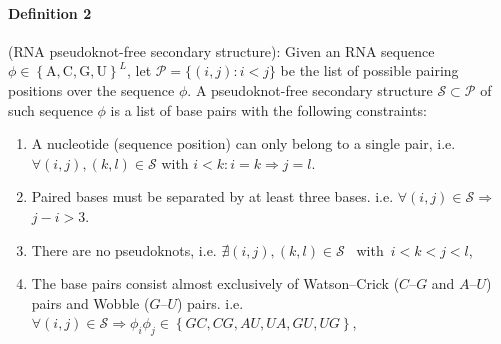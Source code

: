 \paragraph{\textbf{Definition 2} } (RNA pseudoknot-free secondary structure): Given an RNA sequence $\phi \in \left\{\text{A},\text{C},\text{G},\text{U}\right\}^L$, let $\mathcal{P}=\big \{(i,j) \colon i<j \big \}$ be the list of possible pairing positions over the sequence $\phi$. A pseudoknot-free secondary structure $ \mathcal{S}\subset \mathcal{P} $ of such sequence $\phi$ is a list of base pairs  with the following constraints:
\begin{enumerate}
	\item A nucleotide (sequence position) can only belong to a single pair, i.e. $\forall (i,j), (k,l) \in \mathcal{S}$ with $i<k \colon i=k \Rightarrow j=l$.
	\item Paired bases must be separated by at least three
	bases. i.e. \(\forall (i,j) \in \mathcal{S} \Rightarrow \) \(j-i>3\).
	\item There are no pseudoknots, i.e. $ \nexists \left(i,j\right), \left(k,l\right) \in \mathcal{S}$
	~with~\(i<k<j<l\),
	\item The base pairs consist almost exclusively of Watson–Crick ($C–G$ and $A–U$) pairs and Wobble ($G–U$) pairs. i.e. $\forall \left(i,j\right) \in \mathcal{S}\Rightarrow \phi_i\phi_j \in \left\{GC,CG,AU,UA,GU,UG\right\}$,
\end{enumerate}
